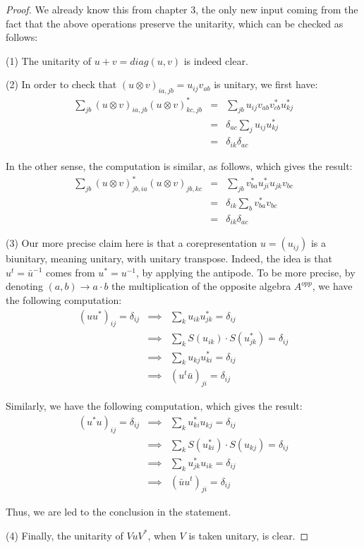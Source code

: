 \documentclass[12pt]{amsbook}
\begin{document}
\begin{proof}
We already know this from chapter 3, the only new input coming from the fact that the above operations preserve the unitarity, which can be checked as follows:

\medskip

(1) The unitarity of $u+v=diag(u,v)$ is indeed clear.

\medskip

(2) In order to check that $(u\otimes v)_{ia,jb}=u_{ij}v_{ab}$ is unitary, we first have:
\begin{eqnarray*}
\sum_{jb}(u\otimes v)_{ia,jb}(u\otimes v)_{kc,jb}^*
&=&\sum_{jb}u_{ij}v_{ab}v_{cb}^*u_{kj}^*\\
&=&\delta_{ac}\sum_ju_{ij}u_{kj}^*\\
&=&\delta_{ik}\delta_{ac}
\end{eqnarray*}

In the other sense, the computation is similar, as follows, which gives the result:
\begin{eqnarray*}
\sum_{jb}(u\otimes v)^*_{jb,ia}(u\otimes v)_{jb,kc}
&=&\sum_{jb}v_{ba}^*u_{ji}^*u_{jk}v_{bc}\\
&=&\delta_{ik}\sum_bv_{ba}^*v_{bc}\\
&=&\delta_{ik}\delta_{ac}
\end{eqnarray*}

(3) Our more precise claim here is that a corepresentation $u=(u_{ij})$ is a biunitary, meaning unitary, with unitary transpose. Indeed, the idea is that $u^t=\bar{u}^{-1}$ comes from $u^*=u^{-1}$, by applying the antipode. To be more precise, by denoting $(a,b)\to a\cdot b$ the multiplication of the opposite algebra $A^{opp}$, we have the following computation:
\begin{eqnarray*}
(uu^*)_{ij}=\delta_{ij}
&\implies&\sum_ku_{ik}u_{jk}^*=\delta_{ij}\\
&\implies&\sum_kS(u_{ik})\cdot S(u_{jk}^*)=\delta_{ij}\\
&\implies&\sum_ku_{kj}u_{ki}^*=\delta_{ij}\\
&\implies&(u^t\bar{u})_{ji}=\delta_{ij}
\end{eqnarray*}

Similarly, we have the following computation, which gives the result:
\begin{eqnarray*}
(u^*u)_{ij}=\delta_{ij}
&\implies&\sum_ku_{ki}^*u_{kj}=\delta_{ij}\\
&\implies&\sum_kS(u_{ki}^*)\cdot S(u_{kj})=\delta_{ij}\\
&\implies&\sum_ku_{jk}^*u_{ik}=\delta_{ij}\\
&\implies&(\bar{u}u^t)_{ji}=\delta_{ij}
\end{eqnarray*}

Thus, we are led to the conclusion in the statement.

\medskip

(4) Finally, the unitarity of $VuV^*$, when $V$ is taken unitary, is clear.
\end{proof}
\end{document}
